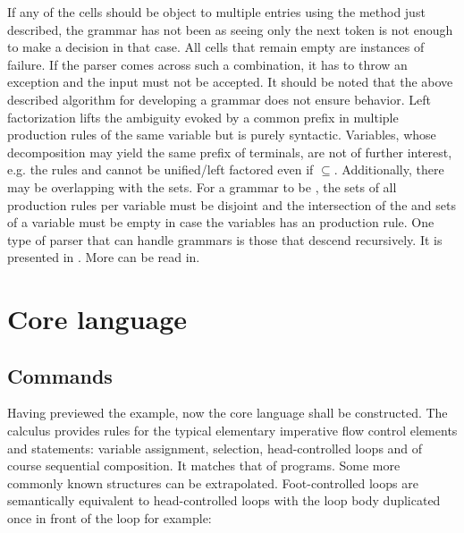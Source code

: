 If any of the cells should be object to multiple entries using the method just described, the grammar has not been \textlang{} as seeing only the next token is not enough to make a decision in that case. All cells that remain empty are instances of failure. If the parser comes across such a combination, it has to throw an exception and the input must not be accepted. It should be noted that the above described algorithm for developing a grammar does not ensure \textlang{} behavior. Left factorization lifts the ambiguity evoked by a common prefix in multiple production rules of the same variable but is purely syntactic. Variables, whose decomposition may yield the same prefix of terminals, are not of further interest, e.g. the rules  and  cannot be unified/left factored even if  $\subseteq{}$. Additionally, there may be overlapping with the  sets. For a grammar to be \textlang{}, the  sets of all production rules per variable must be disjoint and the intersection of the  and  sets of a variable must be empty in case the variables has an \textemptyword{} production rule. One type of parser that can handle \textlang{} grammars is those that descend recursively. It is presented in . More can be read in.

\FloatBarrier
\section{Core language}

\subsection{Commands}

Having previewed the example, now the core language shall be constructed. The  calculus provides rules for the typical elementary imperative flow control elements and statements: variable assignment, selection, head-controlled loops and of course sequential composition. It matches that of  programs. Some more commonly known structures can be extrapolated. Foot-controlled loops are semantically equivalent to head-controlled loops with the loop body duplicated once in front of the loop for example:



